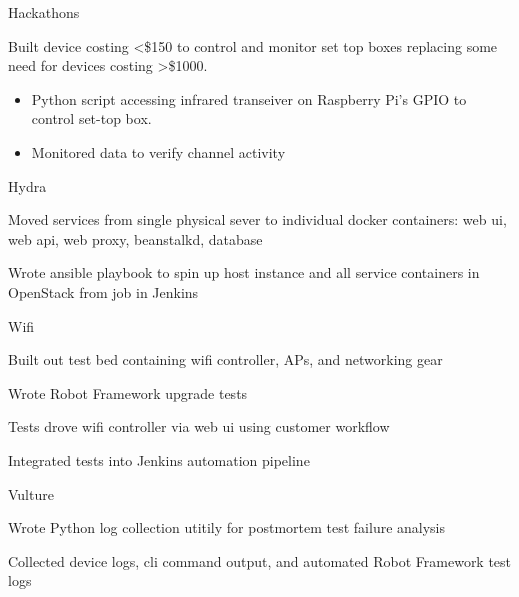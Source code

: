 
\begin{cventries}
  \cventry
    {} {Hackathons} {} {} {
      \begin{cvitems}
      \item {Built device costing <\$150 to control and monitor set top boxes replacing some need for devices costing >\$1000.}
        \begin{itemize}
        \item {Python script accessing infrared transeiver on Raspberry Pi's GPIO to control set-top box.}
        \item {Monitored data to verify channel activity}
        \end{itemize}
      \end{cvitems}
    }

  \cventry
    {} {Hydra} {} {} {
      \begin{cvitems} %
      \item {Moved services from single physical sever to individual docker containers: web ui, web api, web proxy, beanstalkd, database}
      \item {Wrote ansible playbook to spin up host instance and all service containers in OpenStack from job in Jenkins}
      \end{cvitems}
    }

  \cventry
    {} {Wifi} {} {} {
      \begin{cvitems} %
      \item {Built out test bed containing wifi controller, APs, and networking gear}
      \item {Wrote Robot Framework upgrade tests}
      \item {Tests drove wifi controller via web ui using customer workflow}
      \item {Integrated tests into Jenkins automation pipeline}
      \end{cvitems}
    }

  \cventry
    {} {Vulture} {} {} {
      \begin{cvitems} %
      \item {Wrote Python log collection utitily for postmortem test failure analysis}
      \item {Collected device logs, cli command output, and automated Robot Framework test logs}
      \end{cvitems}
    }

\end{cventries}
